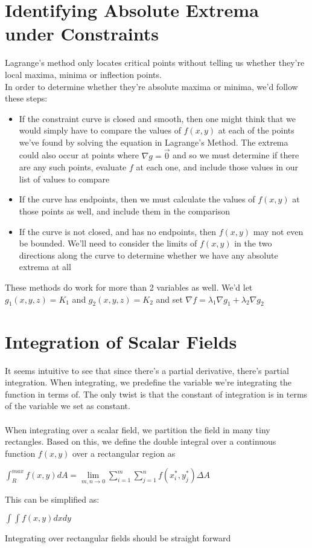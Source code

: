 \documentclass[12pt]{report}
\begin{document}
	\section{Identifying Absolute Extrema under Constraints}
		Lagrange's method only locates critical points without telling us whether they're local maxima, minima or inflection points. \\
		In order to determine whether they're absolute maxima or minima, we'd follow these steps:
		\begin{itemize}
			\item If the constraint curve is closed and smooth, then one might think that we would simply have to compare the values of $f(x,y)$ at each of the points we've found by solving the equation in Lagrange's Method. The extrema could also occur at points where $\nabla g = \vec{0}$ and so we must determine if there are any such points, evaluate $f$ at each one, and include those values in our list of values to compare
			\item If the curve has endpoints, then we must calculate the values of $f(x,y)$ at those points as well, and include them in the comparison
			\item If the curve is not closed, and has no endpoints, then $f(x,y)$ may not even be bounded. We'll need to consider the limits of $f(x,y)$ in the two directions along the curve to determine whether we have any absolute extrema at all
		\end{itemize}
		These methods do work for more than 2 variables as well. We'd let $g_1(x,y,z) = K_1$ and $g_2(x,y,z) = K_2$ and set $\nabla f = \lambda_1\nabla g_1 + \lambda_2 \nabla g_2$
	\section{Integration of Scalar Fields}
		It seems intuitive to see that since there's a partial derivative, there's partial integration. When integrating, we predefine the variable we're integrating the function in terms of. The only twist is that the constant of integration is in terms of the variable we set as constant.\\
		\\
		When integrating over a scalar field, we partition the field in many tiny rectangles. Based on this, we define the double integral over a continuous function $f(x,y)$ over a rectangular region as \\
		\centerline{$\int_{R}^{max} f(x,y) dA = \lim\limits_{m,n\rightarrow 0} \sum_{i=1}^{m} \sum_{j=1}^{n} f(x_i^*, y_j^*)\Delta A$}
		This can be simplified as:\\
		\centerline{$\int\int f(x,y) dxdy$}
		Integrating over rectangular fields should be straight forward
\end{document}
